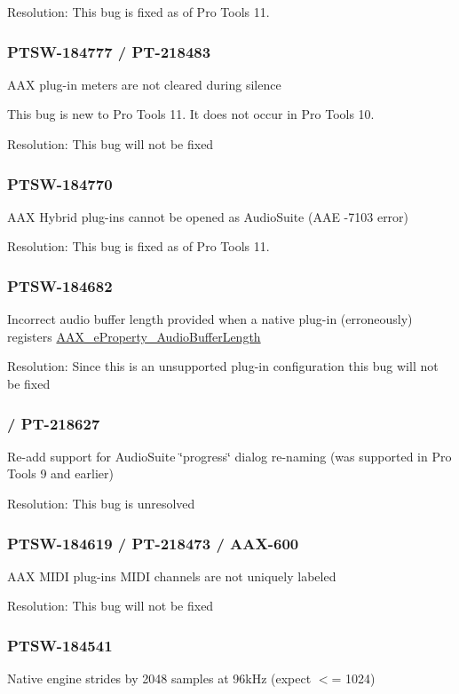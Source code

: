 Resolution\+: This bug is fixed as of Pro Tools 11.\hypertarget{a00374_PTSW-184777}{}\subsubsection{P\+T\+S\+W-\/184777 / P\+T-\/218483}\label{a00374_PTSW-184777}
A\+A\+X plug-\/in meters are not cleared during silence

This bug is new to Pro Tools 11. It does not occur in Pro Tools 10.

Resolution\+: This bug will not be fixed\hypertarget{a00374_PTSW-184770}{}\subsubsection{P\+T\+S\+W-\/184770}\label{a00374_PTSW-184770}
A\+A\+X Hybrid plug-\/ins cannot be opened as Audio\+Suite (A\+A\+E -\/7103 error)

Resolution\+: This bug is fixed as of Pro Tools 11.\hypertarget{a00374_PTSW-184682}{}\subsubsection{P\+T\+S\+W-\/184682}\label{a00374_PTSW-184682}
Incorrect audio buffer length provided when a native plug-\/in (erroneously) registers \hyperlink{a00283_a6571f4e41a5dd06e4067249228e2249ea34b1ae8c8edd3080aee6cd677bed9611}{A\+A\+X\+\_\+e\+Property\+\_\+\+Audio\+Buffer\+Length}

Resolution\+: Since this is an unsupported plug-\/in configuration this bug will not be fixed\hypertarget{a00374_PTSW-184642}{}\subsubsection{/ P\+T-\/218627}\label{a00374_PTSW-184642}
Re-\/add support for Audio\+Suite \char`\"{}progress\char`\"{} dialog re-\/naming (was supported in Pro Tools 9 and earlier)

Resolution\+: This bug is unresolved\hypertarget{a00374_PTSW-184619}{}\subsubsection{P\+T\+S\+W-\/184619 / P\+T-\/218473 / A\+A\+X-\/600}\label{a00374_PTSW-184619}
A\+A\+X M\+I\+D\+I plug-\/ins\textquotesingle{} M\+I\+D\+I channels are not uniquely labeled

Resolution\+: This bug will not be fixed\hypertarget{a00374_PTSW-184541}{}\subsubsection{P\+T\+S\+W-\/184541}\label{a00374_PTSW-184541}
Native engine strides by 2048 samples at 96k\+Hz (expect $<$= 1024)

